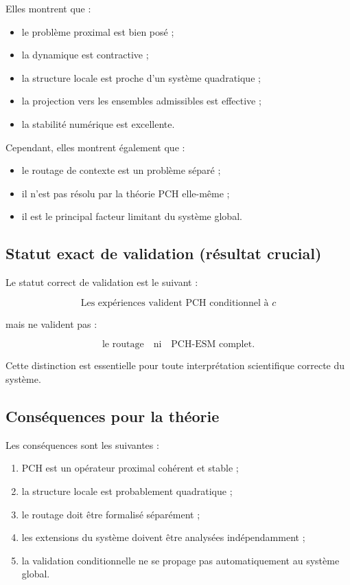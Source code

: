\documentclass[11pt,a4paper]{article}
\newcommand{\1}{\mathbf 1}
\begin{document}
Elles montrent que :

\begin{itemize}
\item le problème proximal est bien posé ;
\item la dynamique est contractive ;
\item la structure locale est proche d’un système quadratique ;
\item la projection vers les ensembles admissibles est effective ;
\item la stabilité numérique est excellente.
\end{itemize}

Cependant, elles montrent également que :

\begin{itemize}
\item le routage de contexte est un problème séparé ;
\item il n’est pas résolu par la théorie PCH elle-même ;
\item il est le principal facteur limitant du système global.
\end{itemize}

\subsection{Statut exact de validation (résultat crucial)}

Le statut correct de validation est le suivant :

\[
\boxed{\text{Les expériences valident PCH conditionnel à } c}
\]

mais ne valident pas :

\[
\boxed{\text{le routage}}
\quad \text{ni} \quad
\boxed{\text{PCH-ESM complet}}.
\]

Cette distinction est essentielle pour toute interprétation scientifique correcte du système.

\subsection{Conséquences pour la théorie}

Les conséquences sont les suivantes :

\begin{enumerate}
\item PCH est un opérateur proximal cohérent et stable ;
\item la structure locale est probablement quadratique ;
\item le routage doit être formalisé séparément ;
\item les extensions du système doivent être analysées indépendamment ;
\item la validation conditionnelle ne se propage pas automatiquement au système global.
\end{enumerate}
\end{document}
